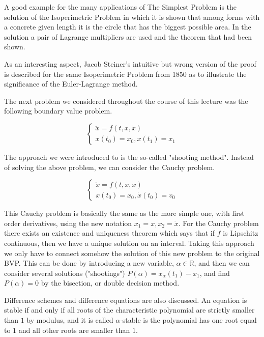 \documentclass{article}
\begin{document}
A good example for the many applications of The Simplest Problem is the solution of the Isoperimetric Problem in which it is shown that among forms with a concrete given length it is the circle that has the biggest possible area. In the solution a pair of Lagrange multipliers are used and the theorem that had been shown.

As an interesting aspect, Jacob Steiner's intuitive but wrong version of the proof is described for the same Isoperimetric Problem from 1850  as to illustrate the significance of the Euler-Lagrange method.

The next problem we considered throughout the course of this lecture was the following boundary value problem.

\[
   \begin{cases}
               \ddot{x} = f(t,x,\dot{x})\\
               x(t_0) = x_0, x(t_1) = x_1
   \end{cases}
\]

The approach we were introduced to is the so-called "shooting method".
Instead of solving the above problem, we can consider the Cauchy problem.

\[
   \begin{cases}
               \ddot{x} = f(t,x,\dot{x})\\
               x(t_0) = x_0, \dot{x}(t_0) = v_0
   \end{cases}
\]

This Cauchy problem is basically the same as the more simple one, with first order derivatives, using the new notation $x_1 = x, x_2 = \dot{x}$. For the Cauchy problem there exists an existence and uniqueness theorem which says that if $f$ is Lipschitz continuous, then we have a unique solution on an interval. Taking this approach we only have to connect somehow the solution of this new problem to the original BVP. This can be done by introducing a new variable, $\alpha \in \mathbb{R}$, and then we can consider several solutions ("shootings") $P(\alpha) = x_{\alpha}(t_1) - x_1$, and find $P(\alpha) = 0$ by the bisection, or double decision method.

Difference schemes and difference equations are also discussed. An equation is stable if and only if all roots of the characteristic polynomial are strictly smaller than $1$ by modulus, and it is called $\alpha$-stable is the polynomial has one root equal to $1$ and all other roots are smaller than $1$.
\end{document}
